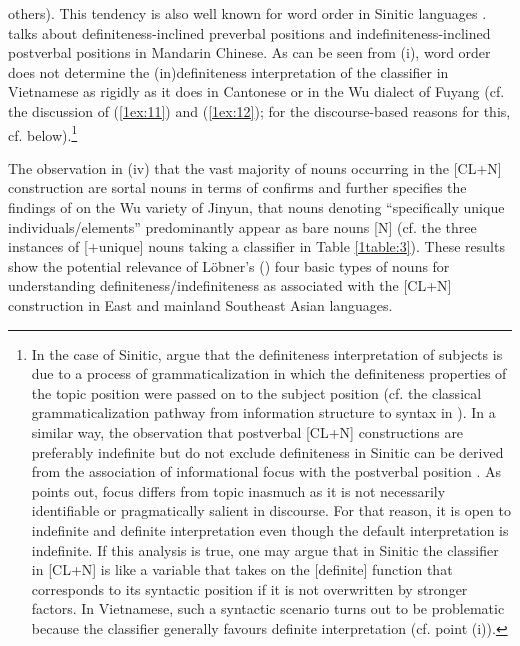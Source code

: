 \documentclass[output=paper]{langsci/langscibook}
\begin{document}
others). This tendency is also well known for word order in Sinitic languages  \citep{li:thompson:76,sun:givon:85,lapolla:95}. \cite[][1166]{chen:04} talks about definiteness-inclined preverbal positions and indefiniteness-inclined postverbal positions in Mandarin Chinese. As can be seen from (i), word order does not determine the (in)definiteness interpretation of the classifier in Vietnamese as rigidly as it does in Cantonese or in the Wu dialect of Fuyang (cf. the discussion of (\ref{1ex:11}) and (\ref{1ex:12}); for the discourse-based reasons for this, cf. below).\footnote{In the case of Sinitic, \cite{li:bisang:12} argue that the definiteness interpretation of subjects is due to a process of grammaticalization in which the definiteness properties of the topic position were passed on to the subject position (cf. the classical grammaticalization pathway from information structure to syntax in \citealt{givon:79}). In a similar way, the observation that postverbal [CL+N] constructions are preferably indefinite but do not exclude definiteness in Sinitic  can be derived from the association of informational focus with the postverbal position \citep{xu:04}. As \cite[][262]{lambrecht:94} points out, focus differs from topic inasmuch as it is not necessarily identifiable or pragmatically salient in discourse. For that reason, it is open to indefinite and definite interpretation even though the default interpretation is indefinite. If this analysis is true, one may argue that in Sinitic  the classifier in [CL+N] is like a variable that takes on the [\pm definite] function that corresponds to its syntactic position if it is not overwritten by stronger factors. In Vietnamese, such a syntactic scenario turns out to be problematic because the classifier generally favours definite interpretation (cf. point (i)).}

{
The observation in (iv) that the vast majority of nouns occurring in the [CL+N] construction are sortal nouns in terms of \cite{lobner:85} confirms and further specifies the findings of \cite[][324]{simpson:17} on the Wu variety of Jinyun, that nouns denoting ``specifically unique individuals/elements'' predominantly appear as bare nouns [N] (cf. the three instances of [+unique] nouns taking a classifier in Table \ref{1table:3}). These results show the potential relevance of L\"obner's (\citeyear{lobner:85,lobner:11}) four basic types of nouns for understanding definiteness/indefiniteness as associated with the [CL+N] construction in East  and mainland Southeast Asian languages.
}
\end{document}
